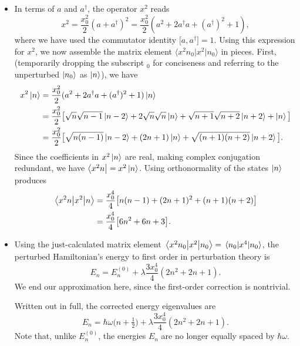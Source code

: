 \documentclass[11pt, a4paper]{article}
\newcommand{\Ham}{Hamiltonian\xspace}
\newcommand{\bmel}[3]{\big \langle {#1} \big | {#2} \big | {#3} \big \rangle}  %
\begin{document}
\begin{itemize}
	\item In terms of $ a $ and $ a^{\dagger} $, the operator $ x^{2} $ reads
	\begin{equation*}
		x^{2} = \frac{x_{0}^{2}}{2}(a+a^{\dagger})^{2} = \frac{x_{0}^{2}}{2}(a^{2} + 2a^{\dagger}a + (a^{\dagger})^{2} + 1),
	\end{equation*}
	where we have used the commutator identity $ \big[a, a^{\dagger}\big] = 1 $. Using this expression for $ x^{2} $, we now assemble the matrix element $ \bmel{x^{2}n_{0}}{x^{2}}{n_{0}} $ in pieces. First, (temporarily dropping the subscript $ _{0} $ for conciseness and referring to the unperturbed $ \ket{n_{0}} $ as $ \ket{n} $), we have
	\begin{align*}
		 x^{2} \ket{n} &= \frac{x_{0}^{2}}{2}(a^{2} + 2a^{\dagger}a + (a^{\dagger})^{2} + 1)\ket{n} \\
		&= \frac{x_{0}^{2}}{2}\big[\sqrt{n}\sqrt{n-1}\ket{n-2} + 2\sqrt{n}\sqrt{n}\ket{n} + \sqrt{n+1}\sqrt{n+2}\ket{n+2} + \ket{n}\big]\\
		& = \frac{x_{0}^{2}}{2}\big[\sqrt{n(n-1)}\ket{n-2}+(2n+1)\ket{n}+\sqrt{(n+1)(n+2)}\ket{n+2}\big].
	\end{align*}
	Since the coefficients in $ x^{2} \ket{n} $ are real, making complex conjugation redundant, we have $ \bra{x^{2}n} = x^{2} \ket{n} $. Using orthonormality of the states $ \ket{n} $ produces
	\begin{align*}
		\mel{x^{2}n}{x^{2}}{n} &= \frac{x_{0}^{4}}{4}\big[n(n-1) + (2n+1)^{2} + (n+1)(n+2)\big]\\
		&= \frac{x_{0}^{4}}{4}\big[6n^{2} + 6n + 3\big].
	\end{align*}
	
	\item Using the just-calculated matrix element $ \mel{x^{2}n_{0}}{x^{2}}{n_{0}} = \mel{n_{0}}{x^{4}}{n_{0}} $, the perturbed \Ham's energy to first order in perturbation theory is
	\begin{equation*}
		E_{n} = E^{(0)}_{n} + \lambda \frac{3x_{0}^{4}}{4}(2n^{2} + 2n + 1).
	\end{equation*}
	We end our approximation here, since the first-order correction is nontrivial.
	
	Written out in full, the corrected energy eigenvalues are
	\begin{equation*}
		E_{n} = \hbar \omega\big(n + \tfrac{1}{2}\big) + \lambda \frac{3x_{0}^{4}}{4}(2n^{2} + 2n + 1).
	\end{equation*}
	Note that, unlike $ E^{(0)}_{n} $, the energies $ E_{n} $ are no longer equally spaced by $ \hbar \omega $.
\end{itemize}
\end{document}
